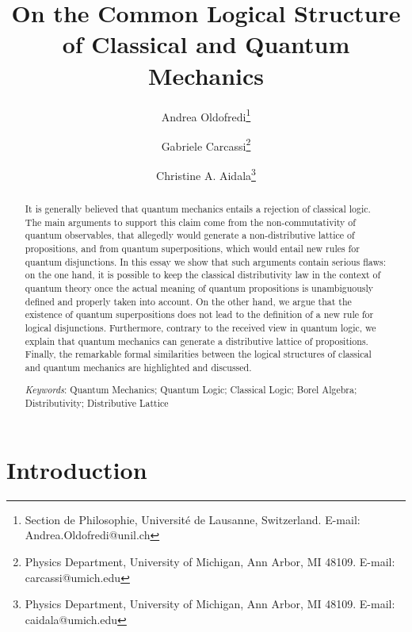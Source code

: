\documentclass[11pt, executivepaper]{article}
\begin{document}
\title{\textbf{On the Common Logical Structure of Classical and Quantum Mechanics}}

\author{Andrea Oldofredi\thanks{Section de Philosophie, Universit\'e de Lausanne, Switzerland. E-mail: Andrea.Oldofredi@unil.ch} \and Gabriele Carcassi\thanks{Physics Department, University of Michigan, Ann Arbor, MI 48109. E-mail: carcassi@umich.edu} \and Christine A. Aidala\thanks{Physics Department, University of Michigan, Ann Arbor, MI 48109. E-mail: caidala@umich.edu}}


\maketitle

\begin{abstract}
It is generally believed that quantum mechanics entails a rejection of classical logic. The main arguments to support this claim come from the non-commutativity of quantum observables, that allegedly would generate a non-distributive lattice of propositions, and from quantum superpositions, which would entail new rules for quantum disjunctions. In this essay we show that such arguments contain serious flaws: on the one hand, it is possible to keep the classical distributivity law in the context of quantum theory once the actual meaning of quantum propositions is unambiguously defined and properly taken into account. On the other hand, we argue that the existence of quantum superpositions does not lead to the definition of a new rule for logical disjunctions. Furthermore, contrary to the received view in quantum logic, we explain that quantum mechanics can generate a distributive lattice of propositions. Finally, the remarkable formal similarities between the logical structures of classical and quantum mechanics are highlighted and discussed. 
\vspace{4mm}

\noindent \emph{Keywords}: Quantum Mechanics; Quantum Logic; Classical Logic; Borel Algebra; Distributivity; Distributive Lattice
\end{abstract}
\vspace{5mm}
\clearpage

\tableofcontents
\vspace{5mm}

\section{Introduction}
\end{document}
